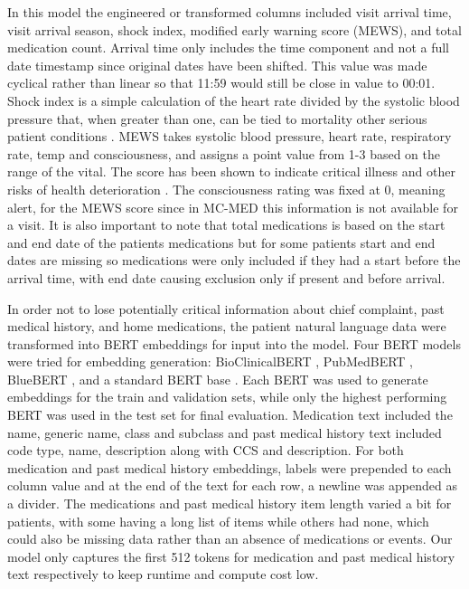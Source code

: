 \documentclass[sigconf]{acmart}
\begin{document}
In this model the engineered or transformed columns included visit arrival time, visit arrival season, shock index, modified early warning score (MEWS), and total medication count. Arrival time only includes the time component and not a full date timestamp since original dates have been shifted. This value was made cyclical rather than linear so that 11:59 would still be close in value to 00:01. Shock index is a simple calculation of the heart rate divided by the systolic blood pressure that, when greater than one, can be tied to mortality other serious patient conditions \cite{Koch31122019}. MEWS takes systolic blood pressure, heart rate, respiratory rate, temp and consciousness, and assigns a point value from 1-3 based on the range of the vital. The score has been shown to indicate critical illness and other risks of health deterioration \cite{FULLERTON2012557}. The consciousness rating was fixed at 0, meaning alert, for the MEWS score since in MC-MED this information is not available for a visit. It is also important to note that total medications is based on the start and end date of the patients medications but for some patients start and end dates are missing so medications were only included if they had a start before the arrival time, with end date causing exclusion only if present and before arrival.

In order not to lose potentially critical information about chief complaint, past medical history, and home medications, the patient natural language data were transformed into BERT embeddings for input into the model. Four BERT models were tried for embedding generation: BioClinicalBERT \cite{BioMedBERT}, PubMedBERT \cite{pubmedbert}, BlueBERT \cite{peng2019transfer}, and a standard BERT base \cite{DBLP:journals/corr/abs-1810-04805}. Each BERT was used to generate embeddings for the train and validation sets, while only the highest performing BERT was used in the test set for final evaluation. Medication text included the name, generic name, class and subclass and past medical history text included code type, name, description along with CCS and description. For both medication and past medical history embeddings, labels were prepended to each column value and at the end of the text for each row, a newline was appended as a divider. The medications and past medical history item length varied a bit for patients, with some having a long list of items while others had none, which could also be missing data rather than an absence of medications or events. Our model only captures the first 512 tokens for medication and past medical history text respectively to keep runtime and compute cost low.
\end{document}

